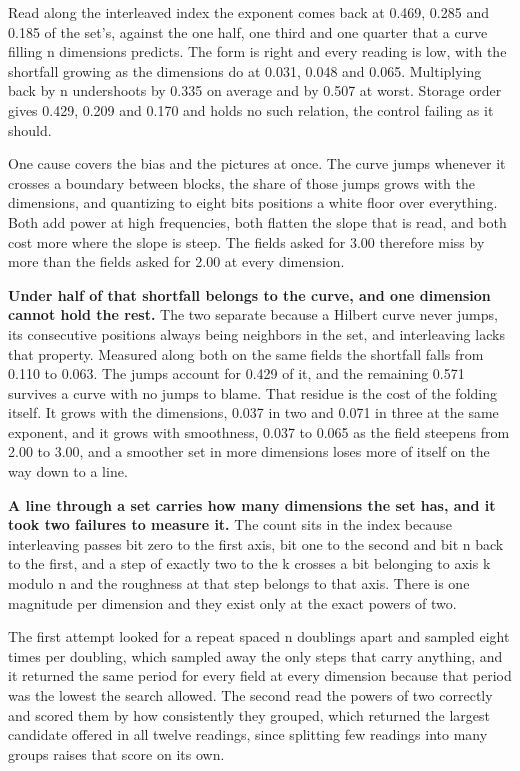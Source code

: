 Read along the interleaved index the exponent comes back at 0.469, 0.285 and 0.185 of the set's, against the one half, one third and one quarter that a curve filling n dimensions predicts. The form is right and every reading is low, with the shortfall growing as the dimensions do at 0.031, 0.048 and 0.065. Multiplying back by n undershoots by 0.335 on average and by 0.507 at worst. Storage order gives 0.429, 0.209 and 0.170 and holds no such relation, the control failing as it should.

One cause covers the bias and the pictures at once. The curve jumps whenever it crosses a boundary between blocks, the share of those jumps grows with the dimensions, and quantizing to eight bits positions a white floor over everything. Both add power at high frequencies, both flatten the slope that is read, and both cost more where the slope is steep. The fields asked for 3.00 therefore miss by more than the fields asked for 2.00 at every dimension.

\textbf{Under half of that shortfall belongs to the curve, and one dimension cannot hold the rest.} The two separate because a Hilbert curve never jumps, its consecutive positions always being neighbors in the set, and interleaving lacks that property. Measured along both on the same fields the shortfall falls from 0.110 to 0.063. The jumps account for 0.429 of it, and the remaining 0.571 survives a curve with no jumps to blame. That residue is the cost of the folding itself. It grows with the dimensions, 0.037 in two and 0.071 in three at the same exponent, and it grows with smoothness, 0.037 to 0.065 as the field steepens from 2.00 to 3.00, and a smoother set in more dimensions loses more of itself on the way down to a line.

\textbf{A line through a set carries how many dimensions the set has, and it took two failures to measure it.} The count sits in the index because interleaving passes bit zero to the first axis, bit one to the second and bit n back to the first, and a step of exactly two to the k crosses a bit belonging to axis k modulo n and the roughness at that step belongs to that axis. There is one magnitude per dimension and they exist only at the exact powers of two.

The first attempt looked for a repeat spaced n doublings apart and sampled eight times per doubling, which sampled away the only steps that carry anything, and it returned the same period for every field at every dimension because that period was the lowest the search allowed. The second read the powers of two correctly and scored them by how consistently they grouped, which returned the largest candidate offered in all twelve readings, since splitting few readings into many groups raises that score on its own.

